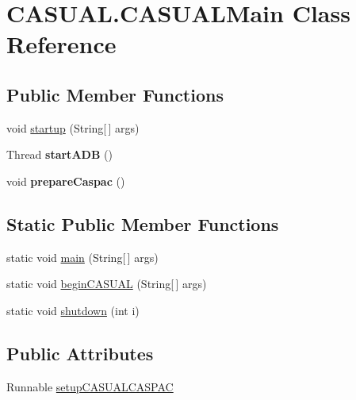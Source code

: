 \hypertarget{classCASUAL_1_1CASUALMain}{\section{C\-A\-S\-U\-A\-L.\-C\-A\-S\-U\-A\-L\-Main Class Reference}
\label{classCASUAL_1_1CASUALMain}
}
\subsection*{Public Member Functions}
\begin{DoxyCompactItemize}
\item 
void \hyperlink{classCASUAL_1_1CASUALMain_a4a2c70ccb1efe2a01ce8b11aeeea947d}{startup} (String\mbox{[}$\,$\mbox{]} args)
\item 
\hypertarget{classCASUAL_1_1CASUALMain_abf4fa23d2d684f022c04ae4c37d7e19e}{Thread {\bfseries start\-A\-D\-B} ()}\label{classCASUAL_1_1CASUALMain_abf4fa23d2d684f022c04ae4c37d7e19e}

\item 
\hypertarget{classCASUAL_1_1CASUALMain_af8cb23fc7509a733dca74ee4787c5335}{void {\bfseries prepare\-Caspac} ()}\label{classCASUAL_1_1CASUALMain_af8cb23fc7509a733dca74ee4787c5335}

\end{DoxyCompactItemize}
\subsection*{Static Public Member Functions}
\begin{DoxyCompactItemize}
\item 
static void \hyperlink{classCASUAL_1_1CASUALMain_a2d7f82ff2961d36d125005f65fdbcf0e}{main} (String\mbox{[}$\,$\mbox{]} args)
\item 
static void \hyperlink{classCASUAL_1_1CASUALMain_a900f3a8c404f68d18d429a8b5ddc249a}{begin\-C\-A\-S\-U\-A\-L} (String\mbox{[}$\,$\mbox{]} args)
\item 
static void \hyperlink{classCASUAL_1_1CASUALMain_aa8a10751e1501b7e2d9146554e4df252}{shutdown} (int i)
\end{DoxyCompactItemize}
\subsection*{Public Attributes}
\begin{DoxyCompactItemize}
\item 
Runnable \hyperlink{classCASUAL_1_1CASUALMain_ac0104001f09bb1d16dea21e6146abb76}{setup\-C\-A\-S\-U\-A\-L\-C\-A\-S\-P\-A\-C}
\end{DoxyCompactItemize}
